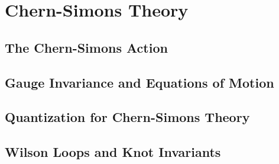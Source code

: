 \section{Chern-Simons Theory}\label{sec: Chern-Simons Theory}
\subsection{The Chern-Simons Action}\label{subsec: Chern-Simons Action} %
\par 
\subsection{Gauge Invariance and Equations of Motion} %
\subsection{Quantization for Chern-Simons Theory} %
\subsection{Wilson Loops and Knot Invariants} %

